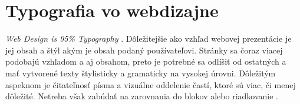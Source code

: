 \documentclass[11pt, a4paper, titlepage] {article}
\begin{document}
\section{Typografia vo webdizajne}
\emph{Web Design is 95\% Typography} \cite{Reichestein:Typografia}. Dôležitejšie ako vzhľad webovej prezentácie je jej obsah a štýl akým je obsah podaný používateľovi. Stránky sa čoraz viacej podobajú vzhľadom a aj obsahom, preto je potrebné sa odlíšiť od ostatných a mať vytvorené texty štylisticky a gramaticky na vysokej úrovni. Dôležitým aspeknom je čitateľnosť písma a vizuálne oddelenie častí, ktoré sú viac, či menej dôležité. Netreba však zabúdať na zarovnania do blokov alebo riadkovanie \cite{Justina:Pismo}.



\newpage

\end{document}
